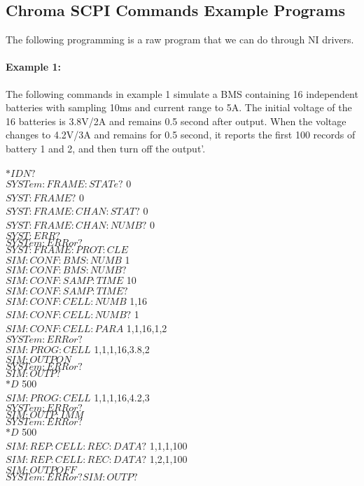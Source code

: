 \subsection{Chroma SCPI Commands Example Programs}
The following programming is a raw program that we can do through NI drivers. 

\paragraph{Example 1:} The following commands in example 1 simulate a BMS containing 16 independent batteries with sampling 10ms and current range to 5A. The initial voltage of the 16 batteries is 3.8V/2A and remains 0.5 second after output. When the voltage changes to 4.2V/3A and remains for
0.5 second, it reports the first 100 records of battery 1 and 2, and then turn off the output'\cite{Chroma_UserManual}.
\\\\
\noindent $*IDN?$ \\
$SYSTem:FRAME:STATe?$ 0\\
$SYST:FRAME?$ 0\\
$SYST:FRAME:CHAN:STAT?$ 0\\
$SYST:FRAME:CHAN:NUMB?$ 0 \\
$SYST:ERR?$\\
$SYSTem:ERRor?$\\ 
$SYST:FRAME:PROT:CLE$\\
$SIM:CONF:BMS:NUMB$ 1\\ 
$SIM:CONF:BMS:NUMB?$ \\
$SIM:CONF:SAMP:TIME$ 10\\ 
$SIM:CONF:SAMP:TIME?$\\ 
$SIM:CONF:CELL:NUMB$ 1,16\\
$SIM:CONF:CELL:NUMB?$ 1\\
$SIM:CONF:CELL:PARA$ 1,1,16,1,2\\
$SYSTem:ERRor?$\\ 
$SIM:PROG:CELL$ 1,1,1,16,3.8,2\\
$SIM:OUTP ON$\\
$SYSTem:ERRor?$ \\
$SIM:OUTP?$\\
$*D$ 500\\
$SIM:PROG:CELL$ 1,1,1,16,4.2,3\\
$SYSTem:ERRor?$\\ 
$SIM:OUTP:IMM$\\
$SYSTem:ERRor?$\\
$*D$ 500\\
$SIM:REP:CELL:REC:DATA?$ 1,1,1,100\\
$SIM:REP:CELL:REC:DATA?$ 1,2,1,100\\
$SIM:OUTP OFF$\\
$SYSTem:ERRor? SIM:OUTP?$\\


